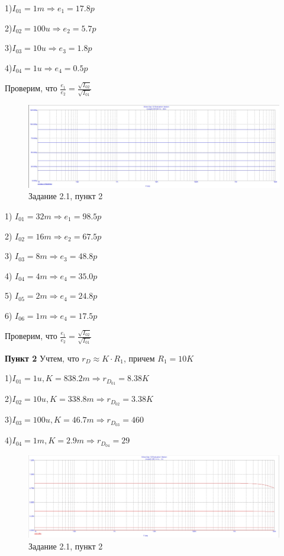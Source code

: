 \documentclass[a4paper, 14pt]{extarticle}%
\begin{document}
1)$I_{01} = 1m \Rightarrow e_1 = 17.8p$

2)$I_{02} = 100u \Rightarrow e_2 = 5.7p$

3)$I_{03} = 10u \Rightarrow e_3 = 1.8p$

4)$I_{04} = 1u \Rightarrow e_4 = 0.5p$


Проверим, что $\frac{e_1}{e_2} = \frac{\sqrt{I_{02}}}{\sqrt{I_{01}}}$


\begin{figure}[h!]
			\centering
			\includegraphics[width=1.1\linewidth]{2.1/pic11.jpg}
			\caption{Задание 2.1, пункт 2}
			\label{A}
\end{figure}


1) $I_{01} = 32m \Rightarrow e_1 = 98.5p$

2) $I_{02} = 16m \Rightarrow e_2 = 67.5p$

3) $I_{03} = 8m \Rightarrow  e_3 = 48.8p$

4) $I_{04} = 4m \Rightarrow e_4 = 35.0p$

5) $I_{05} = 2m \Rightarrow e_4 = 24.8p$

6) $I_{06} = 1m \Rightarrow e_4 = 17.5p$


Проверим, что $\frac{e_1}{e_2} = \frac{\sqrt{I_{02}}}{\sqrt{I_{01}}}$

\textbf{Пункт 2}
Учтем, что $r_D \approx K\cdot R_1$, причем $R_1 = 10K$

1)$I_{01} = 1u, K = 838.2m \Rightarrow r_{D_{01}} = 8.38K$

2)$I_{02} = 10u, K = 338.8m \Rightarrow r_{D_{02}} = 3.38K$

3)$I_{03} = 100u, K = 46.7m  \Rightarrow r_{D_{03}} = 460$

4)$I_{04} = 1m, K = 2.9m \Rightarrow r_{D_{04}} = 29$


\begin{figure}[h!]
			\centering
			\includegraphics[width=1.1\linewidth]{2.1/pic13.jpg}
			\caption{Задание 2.1, пункт 2}
			\label{A}
\end{figure}
\end{document}
